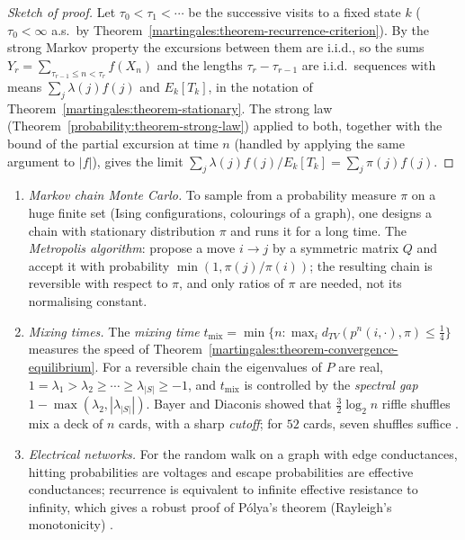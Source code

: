 \begin{proof}[Sketch of proof]
Let $\tau_0 < \tau_1 < \cdots$ be the successive visits to a fixed state $k$ ($\tau_0 < \infty$ a.s.\ by Theorem~\ref{martingales:theorem-recurrence-criterion}). By the strong Markov property the excursions between them are
i.i.d., so the sums $Y_r = \sum_{\tau_{r-1} \leq n < \tau_r}f(X_n)$ and the lengths $\tau_r - \tau_{r-1}$ are i.i.d.\ sequences with means $\sum_j\lambda(j)f(j)$ and $E_k[T_k]$, in the notation of Theorem~\ref{martingales:theorem-stationary}. The
strong law (Theorem~\ref{probability:theorem-strong-law}) applied to both, together with the bound of the partial excursion at time $n$ (handled by applying the same argument to $|f|$), gives the limit
$\sum_j\lambda(j)f(j)/E_k[T_k] = \sum_j\pi(j)f(j)$.
\end{proof}

\begin{remark}\label{martingales:remark-mixing}
\begin{enumerate}
\item \emph{Markov chain Monte Carlo.} To sample from a probability measure $\pi$ on a huge finite set (Ising configurations, colourings of a graph), one designs a chain with stationary distribution $\pi$ and runs it for a
long time. The \emph{Metropolis algorithm}: propose a move $i \to j$ by a symmetric matrix $Q$ and accept it with probability $\min(1, \pi(j)/\pi(i))$; the resulting chain is reversible with respect to $\pi$, and only ratios of
$\pi$ are needed, not its normalising constant.
\item \emph{Mixing times.} The \emph{mixing time} $t_{\mathrm{mix}} = \min\{n : \max_id_{TV}(p^n(i, \cdot), \pi) \leq \frac14\}$ measures the speed of Theorem~\ref{martingales:theorem-convergence-equilibrium}. For a reversible chain the
eigenvalues of $P$ are real, $1 = \lambda_1 > \lambda_2 \geq \cdots \geq \lambda_{|S|} \geq -1$, and $t_{\mathrm{mix}}$ is controlled by the \emph{spectral gap} $1 - \max(\lambda_2, |\lambda_{|S|}|)$. Bayer and Diaconis showed that
$\frac32\log_2n$ riffle shuffles mix a deck of $n$ cards, with a sharp \emph{cutoff}; for $52$ cards, seven shuffles suffice \cite{levin-peres-wilmer}.
\item \emph{Electrical networks.} For the random walk on a graph with edge conductances, hitting probabilities are voltages and escape probabilities are effective conductances; recurrence is equivalent to infinite
effective resistance to infinity, which gives a robust proof of P\'olya's theorem (Rayleigh's monotonicity) \cite{doyle-snell}.
\end{enumerate}
\end{remark}

